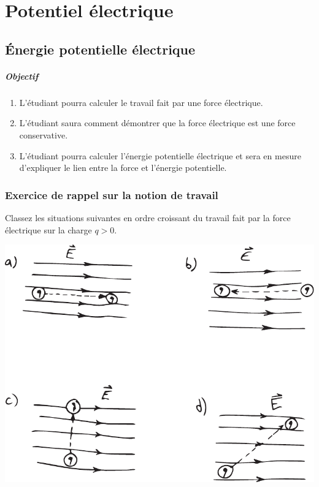 \chapter{Potentiel électrique}


\section{Énergie potentielle électrique}


\paragraph{Objectif}

\begin{enumerate}
  \item L'étudiant pourra calculer le travail fait par une force électrique.
  \item L'étudiant saura comment démontrer que la force électrique est une
    force conservative.
  \item L'étudiant pourra calculer l'énergie potentielle électrique et sera en
    mesure d'expliquer le lien entre la force et l'énergie potentielle.
\end{enumerate}



\subsection*{Exercice de rappel sur la notion de travail}


Classez les situations suivantes en ordre croissant du travail fait par la
force électrique sur la charge $q > 0$.

\begin{center}
  \includegraphics[scale=0.7]{04-potentiel/figures/travail-force-electrique.pdf}
\end{center}

